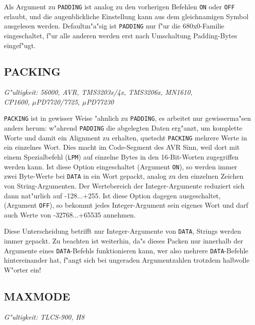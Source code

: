 \documentclass[12pt,a4paper,twoside]{report}
\makeatletter
\newcommand{\tty}[1]{{\tt #1}}
\newcommand{\ttindex}[1]{\index{#1@{\tt #1}}}
\makeatother
\begin{document}
Als Argument zu \tty{PADDING} ist analog zu den vorherigen Befehlen
\tty{ON} oder \tty{OFF} erlaubt, und die augenblickliche Einstellung
kann aus dem gleichnamigen Symbol ausgelesen werden. Defaultm"a"sig
ist \tty{PADDING} nur f"ur die 680x0-Familie eingeschaltet, f"ur alle
anderen werden erst nach Umschaltung Padding-Bytes eingef"ugt.


\subsection{PACKING}
\ttindex{PACKING}\label{SectPACKING}

{\em G"ultigkeit: 56000, AVR, TMS3203x/4x, TMS3206x, MN1610, \\
     CP1600, $\mu$PD7720/7725, $\mu$PD77230}

{\tt PACKING} ist in gewisser Weise "ahnlich zu {\tt PADDING}, es arbeitet
nur gewisserma"sen anders herum: w"ahrend {\tt PADDING} die
abgelegten Daten erg"anzt, um komplette Worte und damit ein Alignment zu
erhalten, quetscht {\tt PACKING} mehrere Werte in ein einzelnes Wort.
Dies macht im Code-Segment des AVR Sinn, weil dort mit einem Spezialbefehl
({\tt LPM}) auf einzelne Bytes in den 16-Bit-Worten zugegriffen werden
kann.  Ist diese Option eingeschaltet (Argument {\tt ON}), so werden immer
zwei Byte-Werte bei {\tt DATA} in ein Wort gepackt, analog zu den
einzelnen Zeichen von String-Argumenten.  Der Wertebereich der
Integer-Argumente reduziert sich dann nat"urlich auf -128...+255.  Ist
diese Option dagegen ausgeschaltet, (Argument {\tt OFF}), so bekommt
jedes Integer-Argument sein eigenes Wort und darf auch Werte von
-32768...+65535 annehmen.

Diese Unterscheidung betrifft nur Integer-Argumente von {\tt DATA},
Strings werden immer gepackt.  Zu beachten ist weiterhin, da"s dieses
Packen nur innerhalb der Argumente eines {\tt DATA}-Befehls funktionieren
kann, wer also mehrere {\tt DATA}-Befehle hintereinander hat, f"angt sich
bei ungeraden Argumentzahlen trotzdem halbvolle W"orter ein!


\subsection{MAXMODE}
\ttindex{MAXMODE}

{\em G"ultigkeit: TLCS-900, H8}
\end{document}
